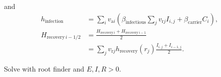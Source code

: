 \documentclass[12pt]{article}
\begin{document}
and
\begin{equation}
  \begin{split}
    h_{\text{infection}}
    &= \sum_i v_{\text{a} i}
    \left(\beta_{\text{infectious}} \sum_j v_{\text{r} j} I_{i, j}
    + \beta_{\text{carrier}} C_i\right),
    \\
    H_{\text{recovery} \, i - 1 / 2}
    &= \frac{H_{\text{recovery} \, i} + H_{\text{recovery} \, i - 1}}{2}
    \\
    &= \sum_j v_{\text{r} j} h_{\text{recovery}}(r_j)
    \frac{I_{i, j} + I_{i - 1, j}}{2}.
  \end{split}
\end{equation}

Solve with root finder and $E, I, R > 0$.




\end{document}
